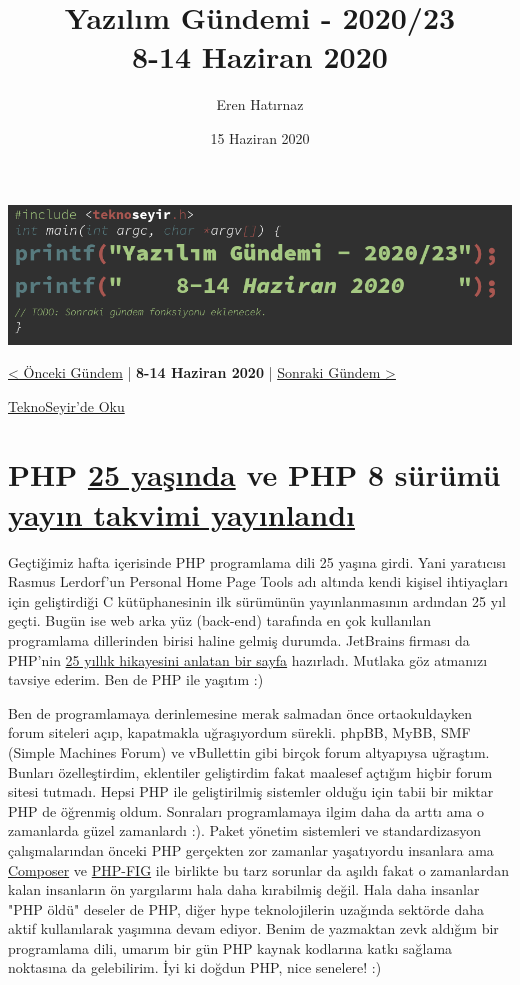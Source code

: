 \documentclass[11pt]{article}
\author{Eren Hatırnaz}
\date{15 Haziran 2020}
\title{Yazılım Gündemi - 2020/23\\\medskip
\large 8-14 Haziran 2020}
\begin{document}
\maketitle
\tableofcontents \clearpage\shorthandoff{=}

\begin{center}
\includegraphics[width=.9\linewidth]{gorseller/yazilim-gundemi-banner.png}
\end{center}

\begin{center}
\href{../22/yazilim-gundemi-2020-22.pdf}{< Önceki Gündem} | \textbf{8-14 Haziran 2020} | \href{../24/yazilim-gundemi-2020-24.pdf}{Sonraki Gündem >}

\href{https://teknoseyir.com/blog/yazilim-gundemi-2020-23}{TeknoSeyir'de Oku}
\end{center}

\section{PHP \href{https://www.jetbrains.com/lp/php-25/}{25 yaşında} ve PHP 8 sürümü \href{https://externals.io/message/110470}{yayın takvimi yayınlandı}}
\label{sec:orgbf441ae}
Geçtiğimiz hafta içerisinde PHP programlama dili 25 yaşına girdi. Yani
yaratıcısı Rasmus Lerdorf'un Personal Home Page Tools adı altında kendi
kişisel ihtiyaçları için geliştirdiği C kütüphanesinin ilk sürümünün
yayınlanmasının ardından 25 yıl geçti. Bugün ise web arka yüz (back-end)
tarafında en çok kullanılan programlama dillerinden birisi haline gelmiş
durumda. JetBrains firması da PHP'nin \href{https://www.jetbrains.com/lp/php-25/}{25 yıllık hikayesini anlatan bir sayfa}
hazırladı. Mutlaka göz atmanızı tavsiye ederim. Ben de PHP ile yaşıtım :)

Ben de programlamaya derinlemesine merak salmadan önce ortaokuldayken forum
siteleri açıp, kapatmakla uğraşıyordum sürekli. phpBB, MyBB, SMF (Simple
Machines Forum) ve vBullettin gibi birçok forum altyapıysa uğraştım. Bunları
özelleştirdim, eklentiler geliştirdim fakat maalesef açtığım hiçbir forum
sitesi tutmadı. Hepsi PHP ile geliştirilmiş sistemler olduğu için tabii bir
miktar PHP de öğrenmiş oldum. Sonraları programlamaya ilgim daha da arttı ama
o zamanlarda güzel zamanlardı :). Paket yönetim sistemleri ve standardizasyon
çalışmalarından önceki PHP gerçekten zor zamanlar yaşatıyordu insanlara ama
\href{https://getcomposer.org/}{Composer} ve \href{https://www.php-fig.org/}{PHP-FIG} ile birlikte bu tarz sorunlar da aşıldı fakat o
zamanlardan kalan insanların ön yargılarını hala daha kırabilmiş değil. Hala
daha insanlar "PHP öldü" deseler de PHP, diğer hype teknolojilerin uzağında
sektörde daha aktif kullanılarak yaşımına devam ediyor. Benim de yazmaktan
zevk aldığım bir programlama dili, umarım bir gün PHP kaynak kodlarına katkı
sağlama noktasına da gelebilirim. İyi ki doğdun PHP, nice senelere! :)
\end{document}
